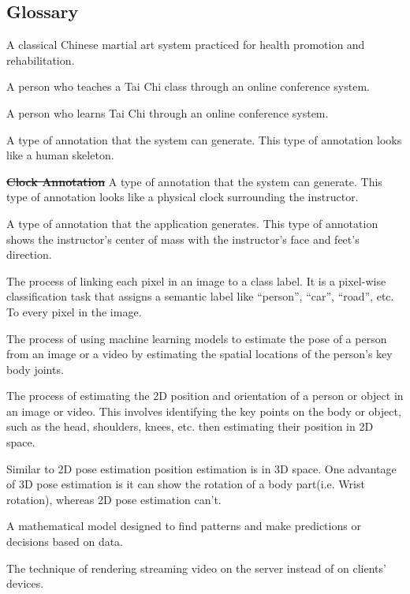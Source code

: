 \documentclass[12pt]{article}
\begin{document}
\subsection{Glossary}\label{Glossary}
\begin{description}
    \item[Tai Chi] A classical Chinese martial art system practiced for health promotion and rehabilitation.
    \item[Instructor] A person who teaches a Tai Chi class through an online conference system.
    \item[Practitioner] A person who learns Tai Chi through an online conference system.
    \item[Skeleton Annotation] A type of annotation that the system can generate. This type of annotation looks like a human skeleton.
    \item\sout{\textbf{Clock Annotation}} A type of annotation that the system can generate. This type of annotation looks like a physical clock surrounding the instructor.
    \item[Center of Mass Visualization] A type of annotation that the application generates. This type of annotation shows the instructor’s center of mass with the instructor's face and feet's direction.
    \item[Semantic Segmentation] The process of linking each pixel in an image to a class label. It is a pixel-wise classification task that assigns a semantic label like “person”, “car”, “road”, etc. To every pixel in the image.
    \item[Pose Estimation/Extraction] The process of using machine learning models to estimate the pose of a person from an image or a video by estimating the spatial locations of the person’s key body joints.
    \item[2D Pose Estimation] The process of estimating the 2D position and orientation of a person or object in an image or video. This involves identifying the key points on the body or object, such as the head, shoulders, knees, etc. then estimating their position in  2D space.
    \item[3D Pose Estimation] Similar to 2D pose estimation position estimation is in 3D space. One advantage of 3D pose estimation is it can show the rotation of a body part(i.e. Wrist rotation), whereas 2D pose estimation can’t.
    \item[Machine Learning Model] A mathematical model designed to find patterns and make predictions or decisions based on data.
    \item[Server-Side Rendering]  The technique of rendering streaming video on the server instead of on clients' devices.

\end{description}
\end{document}
